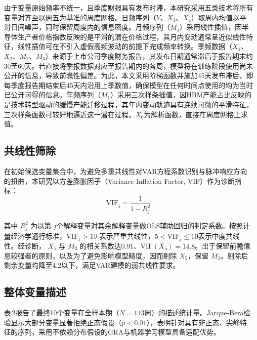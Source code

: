 \documentclass[a4paper,12pt,fontset=fandol]{ctexart}
\begin{document}
由于变量原始频率不统一，且季度财报具有发布时滞，本研究采用五类技术将所有变量对齐至以周五为基准的周度网格。日频序列（$Y$、$X_3$、$X_4$）取周内均值以平滑日间噪声，同时保留周度内的信息密度。月频序列（$M_4$）采用线性插值，因半导体生产者价格指数反映的是平滑的潜在价格过程，其月内变动通常呈近似线性特征，线性插值可在不引入虚假高频波动的前提下完成频率转换。季频数据（$X_1$、$X_2$、$M_2$、$M_3$）来源于上市公司季度财务报告，其发布日期通常滞后于报告期末约30至60天。若直接将季报数据对应至报告期内的各周，模型将在训练阶段使用尚未公开的信息，导致前瞻性偏差。为此，本文采用阶梯函数并施加45天发布滞后，即每季度报告期结束后45天内沿用上季数值，确保模型在任何时间点使用的均为当时已公开可得的信息。年频序列（$M_1$）采用三次样条插值，因HBM产能占比反映的是技术转型驱动的缓慢产能迁移过程，其年内变动轨迹具有连续可微的平滑特征，三次样条函数可较好地逼近这一潜在过程。$X_6$为解析函数，直接在周度网格上求值。

\subsection{共线性筛除}
在初始候选变量集合中，为避免多重共线性对VAR方程系数识别与脉冲响应方向的扭曲，本研究以方差膨胀因子（Variance Inflation Factor, VIF）作为诊断指标：
\begin{equation}
\text{VIF}_j = \frac{1}{1-R_j^2}
\end{equation}

其中 $R_j^2$ 为以第 $j$个解释变量对其余解释变量做OLS辅助回归的判定系数。按照计量经济学通行标准，$\mathrm{VIF}_j > 10$ 表示严重共线性，$5 < \mathrm{VIF}_j \le 10$表示中度共线性。经诊断， $X_5$ 与 $M_3$ 的相关系数达$0.91$、$\mathrm{VIF}(X_5)=14.8$。出于保留前瞻信息较强者的原则，以及为了避免影响模型精度，因而剔除 $X_5$，保留 $M_3$。剔除后剩余变量均降至4.2以下，满足VAR建模的弱共线性要求。

\subsection{整体变量描述}
表\,2报告了最终10个变量在全样本期（$N=113$周）的描述统计量。Jarque-Bera检验显示大部分变量显著拒绝正态假设（$p<0.01$），表明针对具有非正态、尖峰特征的序列，采用不依赖分布假设的GRA与机器学习模型具备适配优势。
\end{document}
